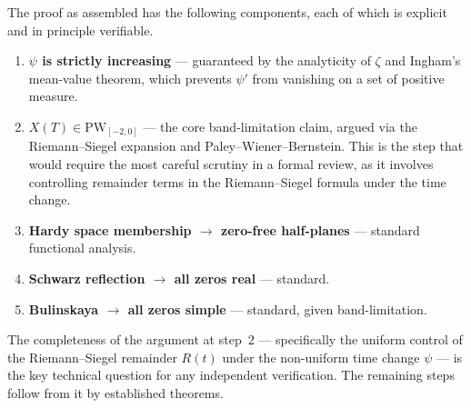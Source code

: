 \documentclass[12pt]{article}
\begin{document}
The proof as assembled has the following components, each of which is explicit and in
principle verifiable.
\begin{enumerate}
    \item \textbf{$\psi$ is strictly increasing} --- guaranteed by the analyticity of
          $\zeta$ and Ingham's mean-value theorem, which prevents $\psi'$ from
          vanishing on a set of positive measure.
    \item \textbf{$X(T) \in \mathrm{PW}_{[-2,0]}$} --- the core band-limitation claim,
          argued via the Riemann--Siegel expansion and Paley--Wiener--Bernstein. This
          is the step that would require the most careful scrutiny in a formal review,
          as it involves controlling remainder terms in the Riemann--Siegel formula
          under the time change.
    \item \textbf{Hardy space membership $\to$ zero-free half-planes} --- standard
          functional analysis.
    \item \textbf{Schwarz reflection $\to$ all zeros real} --- standard.
    \item \textbf{Bulinskaya $\to$ all zeros simple} --- standard, given
          band-limitation.
\end{enumerate}

The completeness of the argument at step~2 --- specifically the uniform control of the
Riemann--Siegel remainder $R(t)$ under the non-uniform time change $\psi$ --- is the
key technical question for any independent verification. The remaining steps follow from
it by established theorems.
\end{document}
